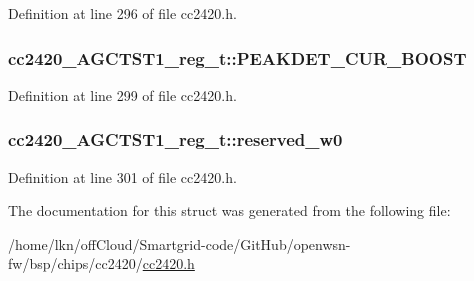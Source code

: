 Definition at line 296 of file cc2420.\+h.

\subsubsection[{\texorpdfstring{P\+E\+A\+K\+D\+E\+T\+\_\+\+C\+U\+R\+\_\+\+B\+O\+O\+ST}{PEAKDET_CUR_BOOST}}]{ cc2420\+\_\+\+A\+G\+C\+T\+S\+T1\+\_\+reg\+\_\+t\+::\+P\+E\+A\+K\+D\+E\+T\+\_\+\+C\+U\+R\+\_\+\+B\+O\+O\+ST}\hypertarget{structcc2420___a_g_c_t_s_t1__reg__t_a458bec3f150590932755c1dc4e360764}{}\label{structcc2420___a_g_c_t_s_t1__reg__t_a458bec3f150590932755c1dc4e360764}


Definition at line 299 of file cc2420.\+h.

\subsubsection[{\texorpdfstring{reserved\+\_\+w0}{reserved_w0}}]{ cc2420\+\_\+\+A\+G\+C\+T\+S\+T1\+\_\+reg\+\_\+t\+::reserved\+\_\+w0}\hypertarget{structcc2420___a_g_c_t_s_t1__reg__t_a01bd3547c8fb510471c118f2f4bb4983}{}\label{structcc2420___a_g_c_t_s_t1__reg__t_a01bd3547c8fb510471c118f2f4bb4983}


Definition at line 301 of file cc2420.\+h.



The documentation for this struct was generated from the following file\+:\begin{DoxyCompactItemize}
\item 
/home/lkn/off\+Cloud/\+Smartgrid-\/code/\+Git\+Hub/openwsn-\/fw/bsp/chips/cc2420/\hyperlink{cc2420_8h}{cc2420.\+h}\end{DoxyCompactItemize}
